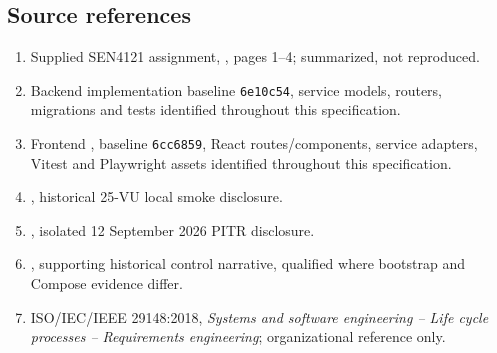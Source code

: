 \documentclass[10pt,a4paper]{article}
\begin{document}
\subsection{Source references}
\begin{enumerate}
\item Supplied SEN4121 assignment, ,
pages 1--4; summarized, not reproduced.
\item Backend implementation baseline \texttt{6e10c54}, service models, routers, migrations
and tests identified throughout this specification.
\item Frontend , baseline \texttt{6cc6859}, React routes/components,
service adapters, Vitest and Playwright assets identified throughout this specification.
\item {}, historical 25-VU local smoke disclosure.
\item {}, isolated 12 September 2026 PITR disclosure.
\item {}, supporting historical control narrative, qualified where
bootstrap and Compose evidence differ.
\item ISO/IEC/IEEE 29148:2018, \emph{Systems and software engineering -- Life cycle
processes -- Requirements engineering}; organizational reference only.
\end{enumerate}
\end{document}
